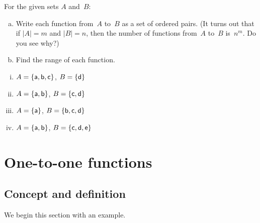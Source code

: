 \begin{exercise}{27}
 For the given sets $A$ and~$B$:
\begin{enumerate}[(a)] 
\item Write each function from~$A$ to~$B$ as a set of ordered pairs. (It turns out that if $|A| = m$
and $|B| = n$, then the number of functions from~$A$ to~$B$ is~$n^m$. Do you see why?)
\item Find the range of each function.
\end{enumerate}
\begin{multicols}{2}
\begin{enumerate}[i.]
\item \label{FunctionsChapExers-FindAll-abc,d}
$A = \{\sf{a},\sf{b},\sf{c}\}$, $B = \{\sf{d}\}$
\item \label{FunctionsChapExers-FindAll-ab,cd}
$A = \{\sf{a},\sf{b}\}$, $B = \{\sf{c},\sf{d}\}$
\item \label{FunctionsChapExers-FindAll-a,bcd}
$A = \{\sf{a}\}$, $B = \{\sf{b},\sf{c},\sf{d}\}$
\item \label{FunctionsChapExers-FindAll-ab,cde}
$A = \{\sf{a},\sf{b}\}$, $B = \{\sf{c},\sf{d},\sf{e}\}$
\end{enumerate}
\end{multicols}
\end{exercise}



\section{One-to-one functions \quad {}} \label{onetoone}

\subsection{Concept and definition}

\medskip\noindent
We begin this section with an example.

